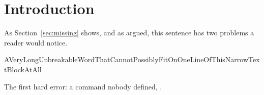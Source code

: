 \documentclass[11pt]{article}
\begin{document}
\section{Introduction}\label{sec:intro}

As Section~\ref{sec:missing} shows, and as \cite{nobody2020} argued, this sentence has two
problems a reader would notice.

\noindent\hbox{AVeryLongUnbreakableWordThatCannotPossiblyFitOnOneLineOfThisNarrowTextBlockAtAll}

The first hard error: a command nobody defined, .
\end{document}
